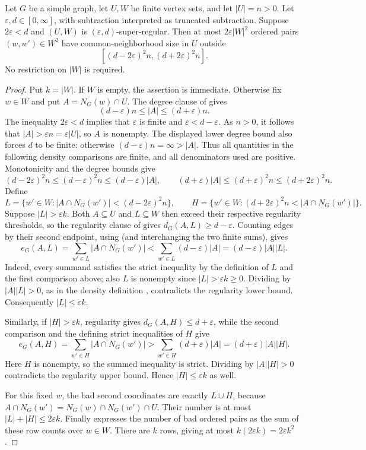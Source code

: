 \begin{helper}
Let $G$ be a simple graph, let $U,W$ be finite vertex sets, and let
$|U|=n>0$.  Let $\varepsilon,d\in[0,\infty]$, with subtraction interpreted
as truncated subtraction.  Suppose $2\varepsilon<d$ and $(U,W)$ is
$(\varepsilon,d)$-super-regular.  Then at most $2\varepsilon|W|^2$
ordered pairs $(w,w')\in W^2$ have common-neighborhood size in $U$ outside
\[
 [(d-2\varepsilon)^2n,(d+2\varepsilon)^2n].
\]
No restriction on $|W|$ is required.
\end{helper}
\begin{proof}
Put $k=|W|$.  If $W$ is empty, the assertion is immediate.  Otherwise fix
$w\in W$ and put $A=N_G(w)\cap U$.  The degree clause of
 gives
\[
 (d-\varepsilon)n\leq |A|\leq(d+\varepsilon)n.
\]
The inequality $2\varepsilon<d$ implies that $\varepsilon$ is finite and
$\varepsilon<d-\varepsilon$.  As $n>0$, it follows that
$|A|>\varepsilon n=\varepsilon|U|$, so $A$ is nonempty.
The displayed lower degree bound also forces $d$ to be finite: otherwise
$(d-\varepsilon)n=\infty>|A|$.  Thus all quantities in the following
density comparisons are finite, and all denominators used are positive.
Monotonicity and the degree bounds give
\[
 (d-2\varepsilon)^2n\leq(d-\varepsilon)^2n
 \leq(d-\varepsilon)|A|,
 \qquad
 (d+\varepsilon)|A|\leq(d+\varepsilon)^2n
 \leq(d+2\varepsilon)^2n.
\]
Define
\[
 L=\{w'\in W:|A\cap N_G(w')|<(d-2\varepsilon)^2n\},\qquad
 H=\{w'\in W:(d+2\varepsilon)^2n<|A\cap N_G(w')|\}.
\]
Suppose $|L|>\varepsilon k$.  Both $A\subseteq U$ and $L\subseteq W$
then exceed their respective regularity thresholds, so the regularity
clause of  gives $d_G(A,L)\geq d-\varepsilon$.
Counting edges by their second endpoint, using
 (and interchanging the two finite sums),
gives
\[
 e_G(A,L)=\sum_{w'\in L}|A\cap N_G(w')|
 <\sum_{w'\in L}(d-\varepsilon)|A|
 =(d-\varepsilon)|A||L|.
\]
Indeed, every summand satisfies the strict inequality by the definition
of $L$ and the first comparison above; also $L$ is nonempty since
$|L|>\varepsilon k\geq0$.  Dividing by $|A||L|>0$, as in the density
definition , contradicts the regularity lower bound.
Consequently $|L|\leq\varepsilon k$.

Similarly, if $|H|>\varepsilon k$, regularity gives
$d_G(A,H)\leq d+\varepsilon$, while the second comparison and the
defining strict inequalities of $H$ give
\[
 e_G(A,H)=\sum_{w'\in H}|A\cap N_G(w')|
 >\sum_{w'\in H}(d+\varepsilon)|A|
 =(d+\varepsilon)|A||H|.
\]
Here $H$ is nonempty, so the summed inequality is strict.  Dividing by
$|A||H|>0$ contradicts the regularity upper bound.  Hence
$|H|\leq\varepsilon k$ as well.

For this fixed $w$, the bad second coordinates are exactly $L\cup H$,
because $A\cap N_G(w')=N_G(w)\cap N_G(w')\cap U$.
Their number is at most $|L|+|H|\leq2\varepsilon k$.
Finally  expresses the number of bad
ordered pairs as the sum of these row counts over $w\in W$.
There are $k$ rows, giving at most $k(2\varepsilon k)=2\varepsilon k^2$.
\end{proof}
